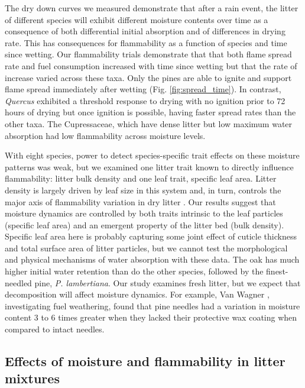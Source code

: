 \documentclass[fire,article,submit,moreauthors,pdftex]{Definitions/mdpi}
\begin{document}
    The dry down curves we measured demonstrate that after a rain event, the litter of different species will exhibit different moisture contents over time as a consequence of both differential initial absorption and of differences in drying rate. This has consequences for flammability as a function of species and time since wetting. Our flammability trials demonstrate that that both flame spread rate and fuel consumption increased with time since wetting but that the rate of increase varied across these taxa. Only the pines are able to ignite and support flame spread immediately after wetting (Fig. \ref{fig:spread_time}). In contrast, \emph{Quercus} exhibited a threshold response to drying with no ignition prior to 72 hours of drying but once ignition is possible, having faster spread rates than the other taxa. The Cupressaceae, which have dense litter but low maximum water absorption had low flammability across moisture levels.

With eight species, power to detect species-specific trait effects on these moisture patterns was weak, but we examined one litter trait known to directly influence flammability: litter bulk density and one leaf trait, specific leaf area. Litter density is largely driven by leaf size in this system and, in turn, controls the major axis of flammability variation in dry litter \cite{Magalhaes+Schwilk-2012}. Our results suggest that moisture dynamics are controlled by both traits intrinsic to the leaf particles (specific leaf area) and an emergent property of the litter bed (bulk density). Specific leaf area here is probably capturing some joint effect of cuticle thickness and total surface area of litter particles, but we cannot test the morphological and physical mechanisms of water absorption with these data. The oak has much higher initial water retention than do the other species, followed by the finest-needled pine, \emph{P. lambertiana}.  Our study examines fresh litter, but we expect that decomposition will affect moisture dynamics. For example, Van Wagner \cite{Van_Wagner-1969}, investigating fuel weathering, found that pine needles had a variation in moisture content 3 to 6 times greater when they lacked their protective wax coating when compared to intact needles.

\subsection{Effects of moisture and flammability in litter mixtures}
\end{document}
